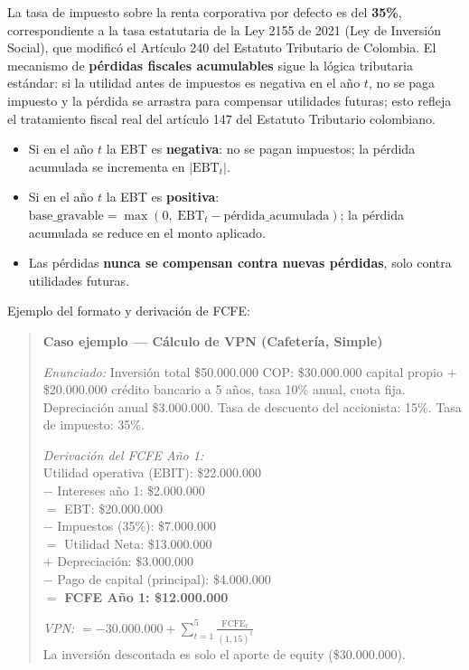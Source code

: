 \documentclass[12pt,a4paper]{article}
\begin{document}
La tasa de impuesto sobre la renta corporativa por defecto es del \textbf{35\%}, correspondiente a la tasa estatutaria de la Ley 2155 de 2021 (Ley de Inversión Social), que modificó el Artículo 240 del Estatuto Tributario de Colombia. El mecanismo de \textbf{pérdidas fiscales acumulables} sigue la lógica tributaria estándar: si la utilidad antes de impuestos es negativa en el año $t$, no se paga impuesto y la pérdida se arrastra para compensar utilidades futuras; esto refleja el tratamiento fiscal real del artículo 147 del Estatuto Tributario colombiano.


\begin{itemize}
  \item Si en el año $t$ la EBT es \textbf{negativa}: no se pagan impuestos; la pérdida acumulada se incrementa en $|\text{EBT}_t|$.
  \item Si en el año $t$ la EBT es \textbf{positiva}: $\text{base\_gravable} = \max(0,\; \text{EBT}_t - \text{pérdida\_acumulada})$; la pérdida acumulada se reduce en el monto aplicado.
  \item Las pérdidas \textbf{nunca se compensan contra nuevas pérdidas}, solo contra utilidades futuras.
\end{itemize}

Ejemplo del formato y derivación de FCFE:

\begin{quote}
\textbf{Caso ejemplo --- Cálculo de VPN (Cafetería, Simple)}

\textit{Enunciado:} Inversión total \$50.000.000 COP: \$30.000.000 capital propio + \$20.000.000 crédito bancario a 5 años, tasa 10\% anual, cuota fija. Depreciación anual \$3.000.000. Tasa de descuento del accionista: 15\%. Tasa de impuesto: 35\%.

\textit{Derivación del FCFE Año 1:}\\
Utilidad operativa (EBIT): \$22.000.000\\
$-$ Intereses año 1: \$2.000.000\\
$=$ EBT: \$20.000.000\\
$-$ Impuestos (35\%): \$7.000.000\\
$=$ Utilidad Neta: \$13.000.000\\
$+$ Depreciación: \$3.000.000\\
$-$ Pago de capital (principal): \$4.000.000\\
$=$ \textbf{FCFE Año 1: \$12.000.000}

\textit{VPN:} $= -30.000.000 + \displaystyle\sum_{t=1}^{5} \frac{\text{FCFE}_t}{(1{,}15)^t}$\\
La inversión descontada es solo el aporte de equity (\$30.000.000).
\end{quote}
\end{document}
